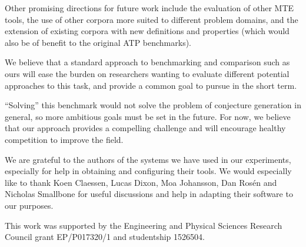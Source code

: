 Other promising directions for future work include the evaluation of other MTE
tools, the use of other corpora more suited to different problem domains, and
the extension of existing corpora with new definitions and properties (which
would also be of benefit to the original ATP benchmarks).

We believe that a standard approach to benchmarking and comparison such as ours
will ease the burden on researchers wanting to evaluate different potential
approaches to this task, and provide a common goal to pursue in the short term.

``Solving'' this benchmark would not solve the problem of conjecture generation
in general, so more ambitious goals must be set in the future. For now, we
believe that our approach provides a compelling challenge and will encourage
healthy competition to improve the field.

\begin{acknowledgements}
  We are grateful to the authors of the systems we have used in our experiments,
  especially for help in obtaining and configuring their tools. We would
  especially like to thank Koen Claessen, Lucas Dixon, Moa Johansson, Dan
  Ros\'{e}n and Nicholas Smallbone for useful discussions and help in adapting
  their software to our purposes.

  This work was supported by the Engineering and Physical Sciences Research
  Council grant EP/P017320/1 and studentship 1526504.
\end{acknowledgements}





